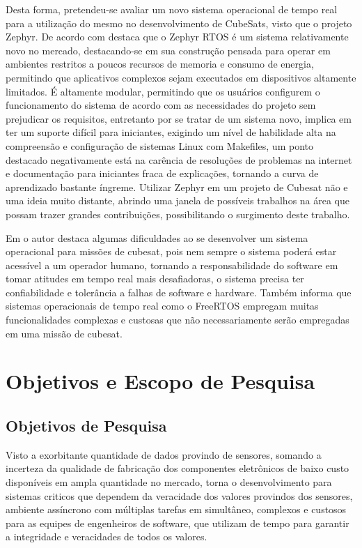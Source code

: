 Desta forma, pretendeu-se avaliar um novo sistema operacional de tempo real para a utilização do mesmo no 
desenvolvimento de CubeSats, visto que o projeto Zephyr. De acordo com \cite{nyffenegger2020connecting}destaca 
que o Zephyr RTOS é um sistema relativamente novo no mercado, destacando-se em sua construção pensada para operar 
em ambientes restritos a poucos recursos de memoria e consumo de energia, permitindo que aplicativos complexos 
sejam executados em dispositivos altamente limitados. É altamente modular, permitindo que os usuários configurem 
o funcionamento do sistema de acordo com as necessidades do projeto sem prejudicar os requisitos, entretanto 
por se tratar de um sistema novo, implica em ter um suporte difícil para iniciantes, exigindo um nível de 
habilidade alta na compreensão e configuração de sistemas Linux com Makefiles, um ponto destacado negativamente 
está na carência de resoluções de problemas na internet e documentação para iniciantes fraca de explicações, 
tornando a curva de aprendizado bastante íngreme. Utilizar Zephyr em um projeto de Cubesat não 
e uma ideia muito distante, abrindo uma janela de possíveis trabalhos na área que possam 
trazer grandes contribuições, possibilitando o surgimento deste trabalho.


Em \cite{Slacka} o autor destaca algumas dificuldades ao se desenvolver um sistema operacional para missões de 
cubesat, pois nem sempre o sistema poderá estar acessível a um operador humano, tornando a responsabilidade do 
software em tomar atitudes em tempo real mais desafiadoras, o sistema precisa ter confiabilidade e tolerância a 
falhas de software e hardware. Também informa que sistemas operacionais de tempo real como o 
FreeRTOS empregam muitas funcionalidades complexas e custosas que não necessariamente serão empregadas em uma 
missão de cubesat.


\section{Objetivos e Escopo de Pesquisa}
\subsection{Objetivos de Pesquisa}
Visto a exorbitante quantidade de dados provindo de sensores, somando a incerteza da qualidade de fabricação dos componentes eletrônicos de baixo custo disponíveis em ampla quantidade no mercado, torna o desenvolvimento para sistemas criticos que dependem da veracidade dos valores provindos dos sensores, ambiente assíncrono com múltiplas tarefas em simultâneo, complexos e custosos para as equipes de engenheiros de software, que utilizam de tempo para garantir a integridade e veracidades de todos os valores. 

